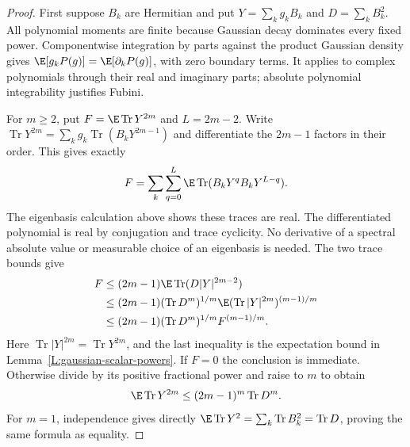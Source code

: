 \begin{proof}
  First suppose $B_k$ are Hermitian and put $Y=\sum_k g_kB_k$ and
  $D=\sum_k B_k^2$. All polynomial moments are finite because Gaussian
  decay dominates every fixed power. Componentwise integration by parts
  against the product Gaussian density gives
  $\E[g_kP(g)]=\E[\partial_kP(g)]$, with zero boundary terms. It applies
  to complex polynomials through their real and imaginary parts; absolute
  polynomial integrability justifies Fubini.

  For $m \ge 2$, put $F=\E\operatorname{Tr}Y^{2m}$ and $L=2m-2$.
  Write $\operatorname{Tr}Y^{2m}=\sum_k g_k
  \operatorname{Tr}(B_kY^{2m-1})$ and differentiate the $2m-1$ factors
  in their order. This gives exactly
  \[
    F=\sum_k\sum_{q=0}^{L}
    \E\operatorname{Tr}(B_kY^qB_kY^{L-q}).
  \]
  The eigenbasis calculation above shows these traces are real.
  The differentiated polynomial is real by conjugation and trace cyclicity.
  No derivative of a spectral absolute value or measurable choice of an
  eigenbasis is needed. The two trace bounds give
  \begin{align*}
    F&\le (2m-1)\E\operatorname{Tr}(D|Y|^{2m-2})\\
    &\le (2m-1)(\operatorname{Tr}D^m)^{1/m}
    \E(\operatorname{Tr}|Y|^{2m})^{(m-1)/m}\\
    &\le (2m-1)(\operatorname{Tr}D^m)^{1/m}F^{(m-1)/m}.
  \end{align*}
  Here $\operatorname{Tr}|Y|^{2m}=\operatorname{Tr}Y^{2m}$, and the last
  inequality is the expectation bound in Lemma~\ref{L:gaussian-scalar-powers}.
  If $F=0$ the conclusion is immediate. Otherwise divide by its positive
  fractional power and raise to $m$ to obtain
  \begin{equation}\label{E:finite-hermitian-gaussian}
    \E\operatorname{Tr}Y^{2m} \le (2m-1)^m\operatorname{Tr}D^m.
  \end{equation}
  For $m=1$, independence gives directly
  $\E\operatorname{Tr}Y^2=\sum_k\operatorname{Tr}B_k^2
  =\operatorname{Tr}D$, proving the same formula as equality.


\end{proof}
